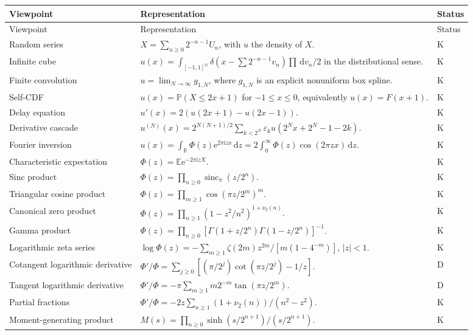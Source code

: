 \documentclass[11pt,oneside]{article}
\numberwithin{equation}{section}
\theoremstyle{definition}
\theoremstyle{remark}
\newcommand{\R}{\mathbb R}
\newcommand{\N}{\mathbb N}
\newcommand{\E}{\mathbb E}
\newcommand{\Prob}{\mathbb P}
\newcommand{\sincpi}{\operatorname{sinc}_{\pi}}
\newcommand{\dd}{\,\mathrm d}
\newcommand{\e}{\mathrm e}
\newcommand{\ii}{\mathrm i}
\newcommand{\eps}{\varepsilon}
\newcommand{\statusknown}{\textcolor{deepviolet}{\textsf{K}}}
\newcommand{\statusderived}{\textcolor{derivedblue}{\textsf{D}}}
\begin{document}
\renewcommand{\arraystretch}{1.22}
\begin{longtable}{@{}p{}p{}p{}@{}}
\toprule
Viewpoint & Representation & Status\\
\midrule
\endfirsthead
\toprule
Viewpoint & Representation & Status\\
\midrule
\endhead
Random series &
$X=\sum_{n\ge0}2^{-n-1}U_n$, with $u$ the density of $X$. & \statusknown\\
Infinite cube &
$u(x)=\int_{[-1,1]^{\N}}\delta(x-\sum2^{-n-1}v_n)\prod\dd v_n/2$ in the distributional sense. & \statusknown\\
Finite convolution &
$u=\lim_{N\to\infty}g_{1,N}$, where $g_{1,N}$ is an explicit nonuniform box spline. & \statusknown\\
Self-CDF &
$u(x)=\Prob(X\le2x+1)$ for $-1\le x\le0$, equivalently $u(x)=F(x+1)$. & \statusknown\\
Delay equation &
$u'(x)=2(u(2x+1)-u(2x-1))$. & \statusknown\\
Derivative cascade &
$u^{(N)}(x)=2^{N(N+1)/2}\sum_{k<2^N}\eps_k
u(2^Nx+2^N-1-2k)$. & \statusknown\\
Fourier inversion &
$u(x)=\int_{\R}\Phi(z)\e^{2\pi\ii zx}\dd z
=2\int_0^\infty\Phi(z)\cos(2\pi zx)\dd z$. & \statusknown\\
Characteristic expectation &
$\Phi(z)=\E\e^{-2\pi\ii zX}$. & \statusknown\\
Sinc product &
$\Phi(z)=\prod_{n\ge0}\sincpi(z/2^n)$. & \statusknown\\
Triangular cosine product &
$\Phi(z)=\prod_{m\ge1}\cos(\pi z/2^m)^m$. & \statusknown\\
Canonical zero product &
$\Phi(z)=\prod_{n\ge1}(1-z^2/n^2)^{1+\nu_2(n)}$. & \statusknown\\
Gamma product &
$\Phi(z)=\prod_{n\ge0}[\Gamma(1+z/2^n)\Gamma(1-z/2^n)]^{-1}$. & \statusknown\\
Logarithmic zeta series &
$\log\Phi(z)=-\sum_{m\ge1}\zeta(2m)z^{2m}/[m(1-4^{-m})]$, $|z|<1$. & \statusknown\\
Cotangent logarithmic derivative &
$\Phi'/\Phi=\sum_{j\ge0}[(\pi/2^j)\cot(\pi z/2^j)-1/z]$. & \statusderived\\
Tangent logarithmic derivative &
$\Phi'/\Phi=-\pi\sum_{m\ge1}m2^{-m}\tan(\pi z/2^m)$. & \statusderived\\
Partial fractions &
$\Phi'/\Phi=-2z\sum_{n\ge1}(1+\nu_2(n))/(n^2-z^2)$. & \statusknown\\
Moment-generating product &
$M(s)=\prod_{n\ge0}\sinh(s/2^{n+1})/(s/2^{n+1})$. & \statusknown\\

\end{longtable}
\end{document}
